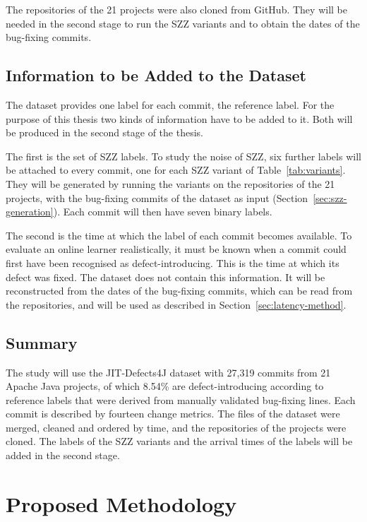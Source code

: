 \documentclass[12pt,a4paper,oneside]{report}
\begin{document}
The repositories of the 21 projects were also cloned from GitHub. They will be
needed in the second stage to run the SZZ variants and to obtain the dates of the
bug-fixing commits.

\section{Information to be Added to the Dataset}\label{sec:additions}

The dataset provides one label for each commit, the reference label. For the
purpose of this thesis two kinds of information have to be added to it. Both
will be produced in the second stage of the thesis.

The first is the set of SZZ labels. To study the noise of SZZ, six further
labels will be attached to every commit, one for each SZZ variant of
Table~\ref{tab:variants}. They will be generated by running the variants on
the repositories of the 21 projects, with the bug-fixing commits of the
dataset as input (Section~\ref{sec:szz-generation}). Each commit will then
have seven binary labels.

The second is the time at which the label of each commit becomes available.
To evaluate an online learner realistically, it must be known when a commit
could first have been recognised as defect-introducing. This is the time at
which its defect was fixed. The dataset does not contain this information. It
will be reconstructed from the dates of the bug-fixing commits, which can be
read from the repositories, and will be used as described in
Section~\ref{sec:latency-method}.

\section{Summary}

The study will use the JIT-Defects4J dataset with 27,319 commits from 21
Apache Java projects, of which 8.54\% are defect-introducing according to
reference labels that were derived from manually validated bug-fixing lines.
Each commit is described by fourteen change metrics. The files of the dataset
were merged, cleaned and ordered by time, and the repositories of the projects
were cloned. The labels of the SZZ variants and the arrival times of the
labels will be added in the second stage.

\chapter{Proposed Methodology}\label{ch:method}
\end{document}
